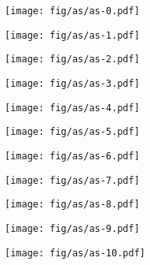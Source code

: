 \documentclass{beamer}
\begin{document}
\begin{frame}
\begin{columns}[t]
  \begin{column}{6cm}
    \vspace{-0.8cm}     
    {
      \begin{figure}[h!]
        \centering
        \texttt{[image: fig/as/as-0.pdf]}
      \end{figure}
    }
    {
      \begin{figure}[h!]
        \centering
        \texttt{[image: fig/as/as-1.pdf]}
      \end{figure}
    }
    {
      \begin{figure}[h!]
        \centering
        \texttt{[image: fig/as/as-2.pdf]}
      \end{figure}
    }
    {
      \begin{figure}[h!]
        \centering
        \texttt{[image: fig/as/as-3.pdf]}
      \end{figure}
    }
    {
      \begin{figure}[h!]
        \centering
        \texttt{[image: fig/as/as-4.pdf]}
      \end{figure}
    }
    {
      \begin{figure}[h!]
        \centering
        \texttt{[image: fig/as/as-5.pdf]}
      \end{figure}
    }
    {
      \begin{figure}[h!]
        \centering
        \texttt{[image: fig/as/as-6.pdf]}
      \end{figure}
    }
    {
      \begin{figure}[h!]
        \centering
        \texttt{[image: fig/as/as-7.pdf]}
      \end{figure}
    }
    {
      \begin{figure}[h!]
        \centering
        \texttt{[image: fig/as/as-8.pdf]}
      \end{figure}
    }
    {
      \begin{figure}[h!]
        \centering
        \texttt{[image: fig/as/as-9.pdf]}
      \end{figure}
    }
    {
      \begin{figure}[h!]
        \centering
        \texttt{[image: fig/as/as-10.pdf]}
      \end{figure}
    }

  \end{column}
\end{columns}

\end{frame}
\end{document}
